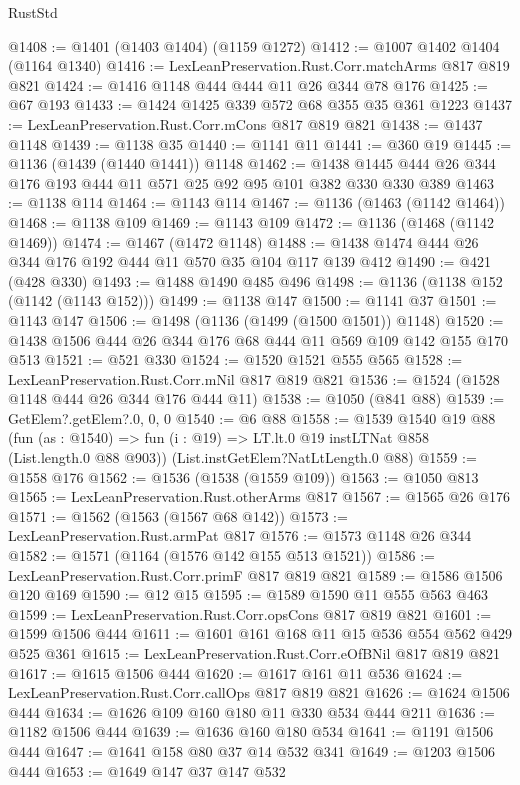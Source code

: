 \begin{lexlean}{RustStd}
\begin{coremodule}
@1408 := @1401 (@1403 @1404) (@1159 @1272)
@1412 := @1007 @1402 @1404 (@1164 @1340)
@1416 := LexLeanPreservation.Rust.Corr.matchArms @817 @819 @821
@1424 := @1416 @1148 @444 @444 @11 @26 @344 @78 @176
@1425 := @67 @193
@1433 := @1424 @1425 @339 @572 @68 @355 @35 @361 @1223
@1437 := LexLeanPreservation.Rust.Corr.mCons @817 @819 @821
@1438 := @1437 @1148
@1439 := @1138 @35
@1440 := @1141 @11
@1441 := @360 @19
@1445 := @1136 (@1439 (@1440 @1441)) @1148
@1462 := @1438 @1445 @444 @26 @344 @176 @193 @444 @11 @571 @25 @92 @95 @101 @382 @330 @330 @389
@1463 := @1138 @114
@1464 := @1143 @114
@1467 := @1136 (@1463 (@1142 @1464))
@1468 := @1138 @109
@1469 := @1143 @109
@1472 := @1136 (@1468 (@1142 @1469))
@1474 := @1467 (@1472 @1148)
@1488 := @1438 @1474 @444 @26 @344 @176 @192 @444 @11 @570 @35 @104 @117 @139 @412
@1490 := @421 (@428 @330)
@1493 := @1488 @1490 @485 @496
@1498 := @1136 (@1138 @152 (@1142 (@1143 @152)))
@1499 := @1138 @147
@1500 := @1141 @37
@1501 := @1143 @147
@1506 := @1498 (@1136 (@1499 (@1500 @1501)) @1148)
@1520 := @1438 @1506 @444 @26 @344 @176 @68 @444 @11 @569 @109 @142 @155 @170 @513
@1521 := @521 @330
@1524 := @1520 @1521 @555 @565
@1528 := LexLeanPreservation.Rust.Corr.mNil @817 @819 @821
@1536 := @1524 (@1528 @1148 @444 @26 @344 @176 @444 @11)
@1538 := @1050 (@841 @88)
@1539 := GetElem?.getElem?.{0, 0, 0}
@1540 := @6 @88
@1558 := @1539
    @1540
    @19
    @88
    (fun (as : @1540) => fun (i : @19) => LT.lt.{0} @19 instLTNat @858 (List.length.{0} @88 @903))
    (List.instGetElem?NatLtLength.{0} @88)
@1559 := @1558 @176
@1562 := @1536 (@1538 (@1559 @109))
@1563 := @1050 @813
@1565 := LexLeanPreservation.Rust.otherArms @817
@1567 := @1565 @26 @176
@1571 := @1562 (@1563 (@1567 @68 @142))
@1573 := LexLeanPreservation.Rust.armPat @817
@1576 := @1573 @1148 @26 @344
@1582 := @1571 (@1164 (@1576 @142 @155 @513 @1521))
@1586 := LexLeanPreservation.Rust.Corr.primF @817 @819 @821
@1589 := @1586 @1506 @120 @169
@1590 := @12 @15
@1595 := @1589 @1590 @11 @555 @563 @463
@1599 := LexLeanPreservation.Rust.Corr.opsCons @817 @819 @821
@1601 := @1599 @1506 @444
@1611 := @1601 @161 @168 @11 @15 @536 @554 @562 @429 @525 @361
@1615 := LexLeanPreservation.Rust.Corr.eOfBNil @817 @819 @821
@1617 := @1615 @1506 @444
@1620 := @1617 @161 @11 @536
@1624 := LexLeanPreservation.Rust.Corr.callOps @817 @819 @821
@1626 := @1624 @1506 @444
@1634 := @1626 @109 @160 @180 @11 @330 @534 @444 @211
@1636 := @1182 @1506 @444
@1639 := @1636 @160 @180 @534
@1641 := @1191 @1506 @444
@1647 := @1641 @158 @80 @37 @14 @532 @341
@1649 := @1203 @1506 @444
@1653 := @1649 @147 @37 @147 @532

\end{coremodule}
\end{lexlean}
